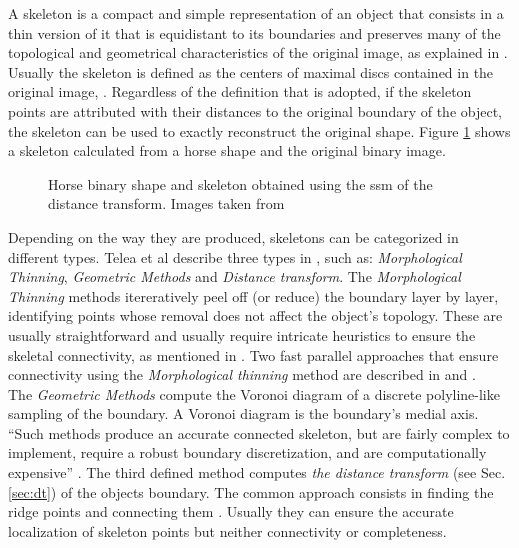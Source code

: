 A skeleton is a compact and simple representation of an object that consists in a thin
version of it that is equidistant to its boundaries and preserves many of
the topological and geometrical characteristics of the original image, as explained in
\cite{wikipedia:skeleton,ssm,augmented}. Usually the skeleton is defined as the centers
of maximal discs contained in the original image, \cite{ssm,augmented}.
Regardless of the definition that is adopted, if the skeleton points are attributed with their distances
to the original boundary of the object, the skeleton can be used to exactly 
reconstruct the original shape. Figure \ref{fig:genskeleton} shows a skeleton calculated
from a horse shape and the original binary image.\\

\begin{figure}[h t b p ! H]
  \centering
\qquad
  \caption{Horse binary shape and skeleton obtained using the ssm of the distance transform. Images taken from \cite{ssm}}
  \label{fig:genskeleton}
\end{figure}


Depending on the way they are produced, skeletons can be categorized in different types.
Telea et al describe three types in \cite{augmented}, such as: \emph{Morphological Thinning},
\emph{Geometric Methods} and \emph{Distance transform}. The \emph{Morphological Thinning} methods itereratively peel off (or reduce) the boundary layer by layer, identifying
points whose removal does not affect the object's topology. These are usually 
straightforward and usually require intricate heuristics to ensure the skeletal
connectivity, as mentioned in \cite{augmented}. Two fast parallel approaches that
ensure connectivity using the \emph{Morphological thinning} method are described
in \cite{onepass} and \cite{thinning}.\\
The \emph{Geometric Methods} compute the Voronoi diagram of a discrete polyline-like
sampling of the boundary. A Voronoi diagram is the boundary's medial axis. ``Such 
methods produce an accurate connected skeleton, but are fairly complex to implement,
require a robust boundary discretization, and are computationally expensive''
\cite[p.251]{augmented}. The third defined method computes \emph{the distance transform}
(see Sec. \ref{sec:dt}) of the objects boundary. The common approach consists in
finding the ridge points and connecting them \cite{maxima,euclideancentre,ridgeineuc}.
 Usually they can ensure the accurate localization of skeleton points 
but neither connectivity or completeness.\\

